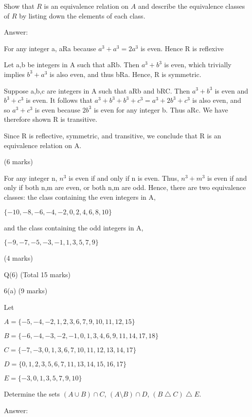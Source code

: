 \documentclass[a4paper,12pt,oneside]{book}
\theoremstyle{definition}
\begin{document}
Show that $R$ is an equivalence relation on $A$ and describe the equivalence classes of $R$ by listing down the elements of each class.

Answer:

For any integer a, aRa because $a^3+a^3 = 2a^3$ is even. Hence R is reflexive

Let a,b be integers in A such that aRb. Then $a^3+b^3$ is even, which trivially implies $b^3+a^3$ is also even, and thus bRa. Hence, R is symmetric.

Suppose a,b,c are integers in A such that aRb and bRC. Then $a^3+b^3$ is even and $b^3+c^3$ is even. It follows that $a^3+b^3+b^3+c^3 = a^3+2b^3+c^3$ is also even, and so $a^3+c^3$ is even because $2b^3$ is even for any integer b. Thus aRc. We have therefore shown R is transitive.

Since R is reflective, symmetric, and transitive, we conclude that R is an equivalence relation on A.

(6 marks)

For any integer n, $n^3$ is even if and only if n is even. Thus, $n^3+m^3$ is even if and only if both n,m are even, or both n,m are odd. Hence, there are two equivalence classes: the class containing the even integers in A, 

$\{-10,-8,-6,-4,-2,0,2,4,6,8,10\}$

and the class containing the odd integers in A,

$\{ -9, -7, -5, -3, -1, 1, 3, 5, 7, 9\}$

(4 marks)








\newpage

Q(6) (Total 15 marks)

6(a) (9 marks)

Let

$A = \{ -5, -4, -2, 1, 2, 3, 6, 7, 9, 10, 11, 12, 15 \}$

$B = \{ -6, -4, -3, -2, -1, 0, 1, 3, 4, 6, 9, 11, 14, 17, 18 \}$

$C = \{ -7, -3, 0, 1, 3, 6, 7, 10, 11, 12, 13, 14, 17 \}$

$D = \{ 0, 1, 2, 3, 5, 6, 7, 11, 13, 14, 15, 16, 17  \}$

$E = \{ -3, 0, 1, 3, 5, 7, 9, 10 \}$

Determine the sets $(A \cup B) \cap C$, $(A \setminus B) \cap D$, $(B \bigtriangleup C) \bigtriangleup E$.

Answer:
\end{document}
